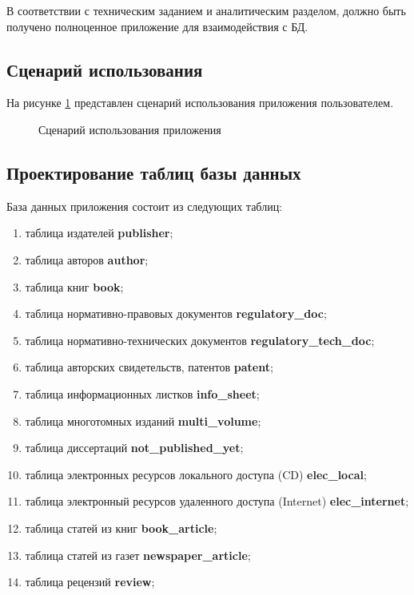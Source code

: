 В соответствии с техническим заданием и аналитическим разделом, должно быть получено полноценное приложение для взаимодействия с БД.

\subsection*{Сценарий использования}%
На рисунке \ref{fig:image31} представлен сценарий использования приложения пользователем.
\begin{figure}[h!]
	\caption{Сценарий использования приложения}
	\label{fig:image31}
\end{figure}

\subsection*{Проектирование таблиц базы данных}%

База данных приложения состоит из следующих таблиц:
\begin{enumerate}
	\item таблица издателей {\bf publisher};
	\item таблица авторов {\bf author};
	\item таблица книг {\bf book};
	\item таблица нормативно-правовых документов {\bf regulatory\_doc};
	\item таблица нормативно-технических документов {\bf regulatory\_tech\_doc};
		\item таблица авторских свидетельств, патентов {\bf patent};
			\item таблица информационных листков {\bf info\_sheet};
				\item таблица многотомных изданий {\bf multi\_volume};
					\item таблица диссертаций {\bf not\_published\_yet};
						\item таблица электронных ресурсов локального доступа (CD) {\bf elec\_local};
							\item таблица электронный ресурсов удаленного доступа (Internet) {\bf elec\_internet};
								\item таблица статей из книг {\bf book\_article};
										\item таблица статей из газет {\bf newspaper\_article};
											\item таблица рецензий {\bf review};
							
\end{enumerate}

